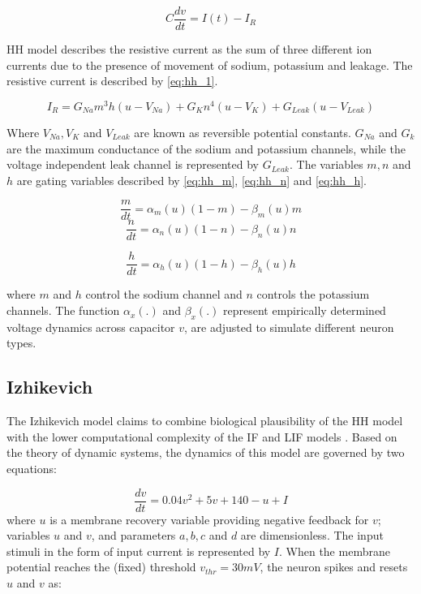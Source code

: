 \begin{equation}
C\frac{dv}{dt}=I(t)-I_R
\end{equation} 

HH model describes the resistive current as the sum of three different ion currents due to the presence of movement of sodium, potassium and leakage. The resistive current is described by \equationname \ref{eq:hh_1}.

\begin{equation}
I_R=G_{Na}m^3h(u-V_{Na})+G_K n^4(u-V_K)+G_{Leak}(u-V_{Leak})
\label{eq:hh_1}
\end{equation}

Where $V_{Na}, V_K$ and $V_{Leak}$ are known as reversible potential constants. $G_{Na}$ and $G_{k}$ are the maximum conductance of the sodium and potassium channels, while the voltage independent leak channel is represented by $G_{Leak}$. The variables $m, n$ and $h$ are gating variables described by \equationnames \ref{eq:hh_m}, \ref{eq:hh_n} and \ref{eq:hh_h}.

\begin{equation}
\frac{m}{dt}=\alpha_m(u)(1-m)-\beta_m(u)m
\label{eq:hh_m}
\end{equation}
\begin{equation}
\frac{n}{dt}=\alpha_n(u)(1-n)-\beta_n(u)n
\label{eq:hh_n}
\end{equation}

\begin{equation}
\frac{h}{dt}=\alpha_h(u)(1-h)-\beta_h(u)h
\label{eq:hh_h}
\end{equation}

where $m$ and $h$ control the sodium channel and $n$ controls the potassium channels. The function $\alpha_x(.)$ and $\beta_x(.)$ represent empirically determined voltage dynamics across capacitor $v$, are adjusted to simulate different neuron types. 

\subsection{Izhikevich}

The Izhikevich model claims to combine biological plausibility of the HH model with the lower computational complexity of the IF and LIF models \citep{izhikevich2004model}. Based on the theory of dynamic systems, the dynamics of this model are governed by two equations:

\begin{equation}
	\frac{dv}{dt}=0.04v^2+5v+140-u+I
\end{equation}
where $u$ is a membrane recovery variable providing negative feedback for $v$; variables $u$ and $v$, and parameters $a, b, c$ and $d$ are dimensionless. The input stimuli in the form of input current is represented by $I$. When the membrane potential reaches the (fixed) threshold $v_{thr}=30 mV$, the neuron spikes and resets $u$ and $v$ as:

